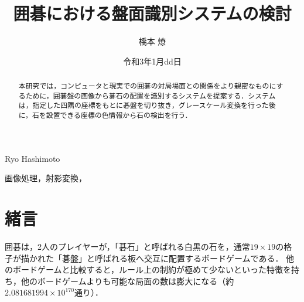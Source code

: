 \documentclass[openright]{nitocs}
\numberwithin{equation}{section}
\begin{document}
    \title{囲碁における盤面識別システムの検討}  %
    \author{橋本 燎}{Ryo Hashimoto} %
    \date{令和3年1月dd日}   %

    \begin{abstract} %
        本研究では，コンピュータと現実での囲碁の対局場面との関係をより親密なものにするために，囲碁盤の画像から碁石の配置を識別するシステムを提案する．システムは，指定した四隅の座標をもとに碁盤を切り抜き，グレースケール変換を行った後に，石を設置できる座標の色情報から石の検出を行う．\\
    \end{abstract}

    \begin{keyword} %
        画像処理，射影変換，
    \end{keyword}


    \maketitle

    \section{緒言}  
    \label{sec:format}
        囲碁は，2人のプレイヤーが，「碁石」と呼ばれる白黒の石を，通常$19\times19$の格子が描かれた「碁盤」と呼ばれる板へ交互に配置するボードゲームである．
        他のボードゲームと比較すると，ルール上の制約が極めて少ないといった特徴を持ち，他のボードゲームよりも可能な局面の数は膨大になる（約$2.081681994 \times 10^{170}$通り\cite{numbers}）．
\end{document}
